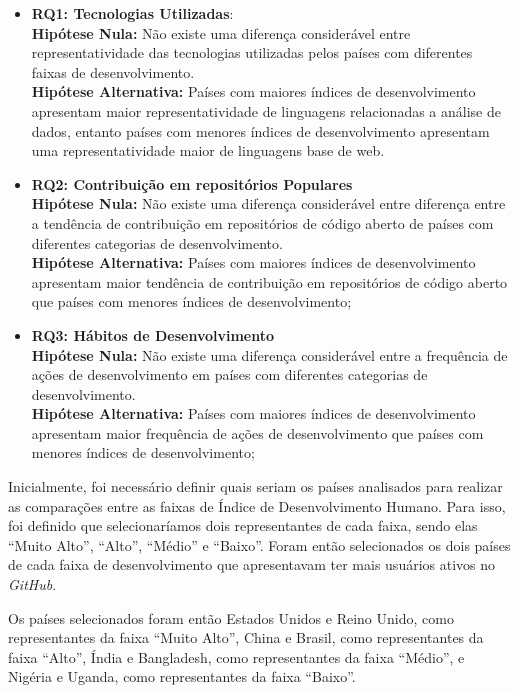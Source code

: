\documentclass[12pt]{article}
\begin{document}
\begin{itemize}
    \item \textbf{RQ1: Tecnologias Utilizadas}: \\
    \textbf{Hipótese Nula:} Não existe uma diferença considerável entre representatividade das tecnologias utilizadas pelos países com diferentes faixas de desenvolvimento. \\
    \textbf{Hipótese Alternativa:} Países com maiores índices de desenvolvimento apresentam maior representatividade de linguagens relacionadas a análise de dados, entanto países com menores índices de desenvolvimento apresentam uma representatividade maior de linguagens base de web.\\
    \item \textbf{RQ2: Contribuição em repositórios Populares} \\
    \textbf{Hipótese Nula:} Não existe uma diferença considerável entre diferença entre a tendência de contribuição em repositórios de código aberto de países com diferentes categorias de desenvolvimento. \\
    \textbf{Hipótese Alternativa:} Países com maiores índices de desenvolvimento apresentam maior tendência de contribuição em repositórios de código aberto que países com menores índices de desenvolvimento;\\
    \item \textbf{RQ3: Hábitos de Desenvolvimento}\\
    \textbf{Hipótese Nula:} Não existe uma diferença considerável entre a frequência de ações de desenvolvimento em países com diferentes categorias de desenvolvimento. \\
   \textbf{ Hipótese Alternativa:} Países com maiores índices de desenvolvimento apresentam maior frequência de ações de desenvolvimento que países com menores índices de desenvolvimento;
\end{itemize}

Inicialmente, foi necessário definir quais seriam os países analisados para realizar as comparações entre as faixas de Índice de Desenvolvimento Humano. Para isso, foi definido que selecionaríamos dois representantes de cada faixa, sendo elas ``Muito Alto'', ``Alto'', ``Médio'' e ``Baixo''. Foram então selecionados os dois países de cada faixa de desenvolvimento que apresentavam ter mais usuários ativos no \textit{GitHub}.

Os países selecionados foram então Estados Unidos e Reino Unido, como representantes da faixa ``Muito Alto'', China e Brasil, como representantes da faixa ``Alto'', Índia e Bangladesh, como representantes da faixa ``Médio'', e Nigéria e Uganda, como representantes da faixa ``Baixo''.
\end{document}
